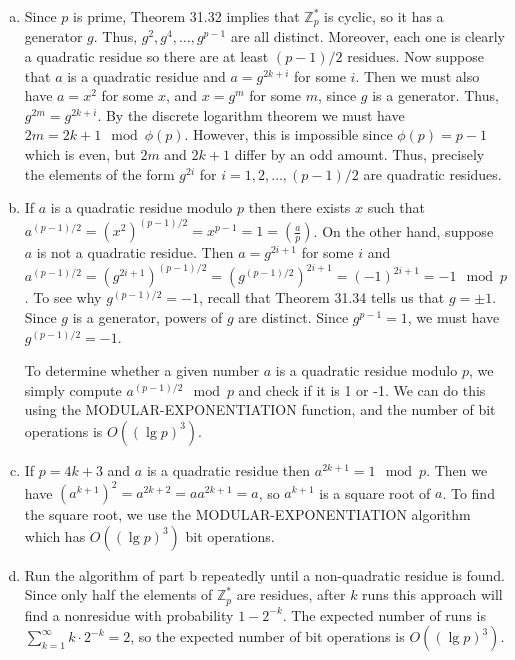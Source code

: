 \documentclass{article}
\begin{document}
\begin{enumerate}[a.]
\item Since $p$ is prime, Theorem 31.32 implies that $\mathbb{Z}_p^*$ is cyclic, so it has a generator $g$. Thus, $g^2, g^4, \ldots, g^{p-1}$ are all distinct.  Moreover, each one is clearly a quadratic residue so there are at least $(p-1)/2$ residues.  Now suppose that $a$ is a quadratic residue and $a = g^{2k+i}$ for some $i$.  Then we must also have $a = x^2$ for some $x$, and $x = g^m$ for some $m$, since $g$ is a generator.  Thus, $g^{2m} = g^{2k+i}$.  By the discrete logarithm theorem we must have $2m = 2k+1 \mod \phi(p)$.  However, this is impossible since $\phi(p) = p-1$ which is even, but $2m$ and $2k+1$ differ by an odd amount. Thus, precisely the elements of the form $g^{2i}$ for $ i=1,2,\ldots, (p-1)/2$ are quadratic residues. 

\item If $a$ is a quadratic residue modulo $p$ then there exists $x$ such that $a^{(p-1)/2} = (x^2)^{(p-1)/2} = x^{p-1} = 1 = \left(\frac{a}{p}\right)$. On the other hand, suppose $a$ is not a quadratic residue.  Then $a = g^{2i+1}$ for some $i$ and $a^{(p-1)/2} = \left(g^{2i+1}\right)^{(p-1)/2} = \left(g^{(p-1)/2}\right)^{2i+1} = (-1)^{2i+1} = -1 \mod p$.  To see why $g^{(p-1)/2} = -1$, recall that Theorem 31.34 tells us that $g = \pm 1$.  Since $g$ is a generator, powers of $g$ are distinct.  Since $g^{p-1} = 1$, we must have $g^{(p-1)/2} = -1$. 

To determine whether a given number $a$ is a quadratic residue modulo $p$, we simply compute $a^{(p-1)/2} \mod p$ and check if it is 1 or -1.  We can do this using the MODULAR-EXPONENTIATION function, and the number of bit operations is $O((\lg p)^3)$.  

\item If $p = 4k+3$ and $a$ is a quadratic residue then $a^{2k+1} = 1 \mod p$. Then we have $(a^{k+1})^2 = a^{2k+2} = aa^{2k+1} = a$, so $a^{k+1}$ is a square root of $a$.  To find the square root, we use the MODULAR-EXPONENTIATION algorithm which has $O((\lg p)^3)$ bit operations.

\item Run the algorithm of part b repeatedly until a non-quadratic residue is found.  Since only half the elements of $\mathbb{Z}_p^*$ are residues, after $k$ runs this approach will find a nonresidue with probability $1-2^{-k}$.  The expected number of runs is $\sum_{k=1}^\infty k\cdot 2^{-k} = 2$, so the expected number of bit operations is $O((\lg p)^3)$.
\end{enumerate}
\end{document}
